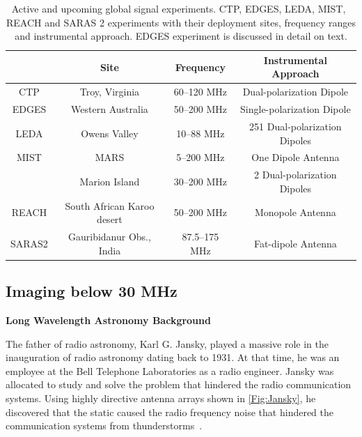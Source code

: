 \begin{table}
	\centering
	\begin{tabular}{ c|ccc} 
		& Site & Frequency & Instrumental Approach \\
		\hline
		CTP & Troy, Virginia & 60--120 MHz & Dual-polarization Dipole \\
		
		EDGES & Western Australia & 50--200 MHz & Single-polarization Dipole \\
		
		LEDA & Owens Valley & 10--88 MHz & 251 Dual-polarization Dipoles \\
		
		MIST & MARS & 5--200 MHz & One Dipole Antenna \\
		\prizm\ & Marion Island & 30--200 MHz & 2 Dual-polarization Dipoles \\
		REACH & South African Karoo desert & 50--200 MHz & Monopole Antenna \\
		SARAS2 & Gauribidanur Obs., India & 87.5--175 MHz & Fat-dipole Antenna \\
		\hline
	\end{tabular}
	\caption{Active and upcoming global signal experiments. CTP, EDGES, LEDA, MIST, \prizm\, REACH and SARAS 2 experiments with their deployment sites, frequency ranges and instrumental approach. EDGES experiment is discussed in detail on text.}
	\label{Tab:CD}
\end{table}  

\subsection{Imaging below 30 MHz}

{\bf{Long Wavelength Astronomy Background}}

The father of radio astronomy, Karl G. Jansky, played a massive role in the inauguration of radio astronomy dating back to 1931. At that time, he was an employee at the Bell Telephone Laboratories as a radio engineer. Jansky was allocated to study and solve the problem that hindered the radio communication systems. Using highly directive antenna arrays shown in \autoref{Fig:Jansky}, he discovered that the static caused the radio frequency noise that hindered the communication systems from thunderstorms~\citep{book:BasicsofRA, book:RA}.

